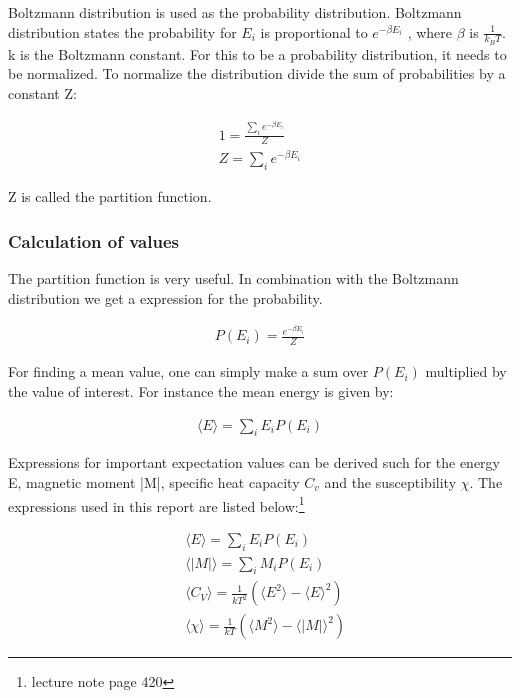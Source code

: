 Boltzmann distribution is used as the probability distribution. Boltzmann distribution states the probability for $E_i$ is proportional to $e^{-\beta E_i}$ , where $\beta$ is $\frac{1}{k_BT}$. k is the Boltzmann constant. For this to be a probability distribution, it needs to be normalized. To normalize the distribution divide the sum of probabilities by a constant Z: 

\begin{align*}
	1 = \frac{\sum_{i} e^{-\beta E_i}}{Z}
	\\
	Z = \sum_{i} e^{-\beta E_i}
\end{align*}

Z is called the partition function. 

\subsubsection{Calculation of values}\label{sec:expect}

The partition function is very useful. In combination with the Boltzmann distribution we get a expression for the probability. 

\begin{align*}
	P(E_i) = \frac{e^{-\beta E_i}}{Z}
\end{align*}

For finding a mean value, one can simply make a sum over $P(E_i)$ multiplied by the value of interest. For instance the mean energy is given by: 

\begin{align*}
	\langle E \rangle = \sum_i E_i P(E_i)
\end{align*}

Expressions for important expectation values can be derived such for the energy E, magnetic moment |M|, specific heat capacity $C_v$ and the susceptibility $\chi$. The expressions used in this report are listed below\cite{compphys}:\footnote{lecture note page 420}

\begin{align}
	&\langle E \rangle = \sum_i E_iP(E_i)
	\label{eq:E}
	\\
	&\langle |M| \rangle = \sum_i M_iP(E_i)
	\label{eq:M}
	\\
	&\langle C_V \rangle = \frac{1}{k T^2}
	\left(
	\langle E^2 \rangle - \langle E \rangle ^2
	\right)
	\label{eq:cv}
	\\
	&\langle \chi \rangle = \frac{1}{kT} 
	\left(
	\langle M^2 \rangle - \langle |M| \rangle ^2
	\right)
	\label{eq:chi}
\end{align}












